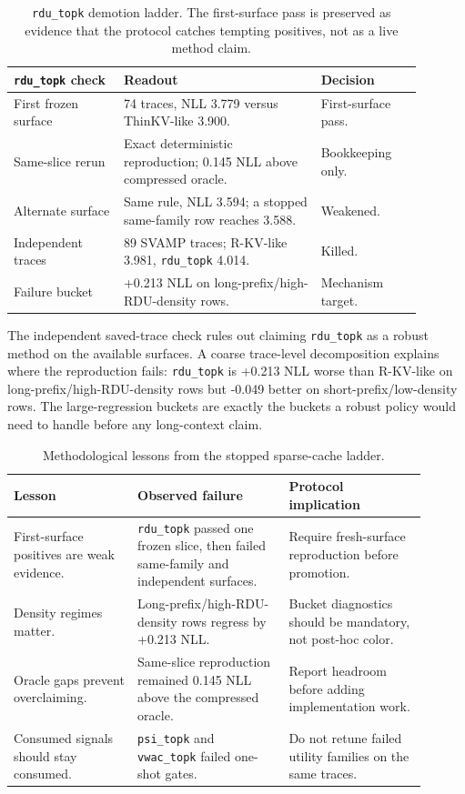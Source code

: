 \documentclass{article}
\begin{document}
\begin{table}[h]
\centering
\small
\begin{tabular}{p{0.24\linewidth}p{0.43\linewidth}p{0.22\linewidth}}
\toprule
\texttt{rdu\_topk} check & Readout & Decision \\
\midrule
First frozen surface & 74 traces, NLL 3.779 versus ThinKV-like 3.900. & First-surface pass. \\
Same-slice rerun & Exact deterministic reproduction; 0.145 NLL above compressed oracle. & Bookkeeping only. \\
Alternate surface & Same rule, NLL 3.594; a stopped same-family row reaches 3.588. & Weakened. \\
Independent traces & 89 SVAMP traces; R-KV-like 3.981, \texttt{rdu\_topk} 4.014. & Killed. \\
Failure bucket & +0.213 NLL on long-prefix/high-RDU-density rows. & Mechanism target. \\
\bottomrule
\end{tabular}
\caption{\texttt{rdu\_topk} demotion ladder. The first-surface pass is preserved as evidence that the protocol catches tempting positives, not as a live method claim.}
\end{table}

The independent saved-trace check rules out claiming \texttt{rdu\_topk} as a
robust method on the available surfaces. A coarse trace-level
decomposition explains where the reproduction fails: \texttt{rdu\_topk} is
+0.213 NLL worse than R-KV-like on long-prefix/high-RDU-density rows but -0.049
better on short-prefix/low-density rows. The large-regression buckets are
exactly the buckets a robust policy would need to handle before any long-context
claim.

\begin{table}[h]
\centering
\small
\begin{tabular}{p{0.27\linewidth}p{0.33\linewidth}p{0.30\linewidth}}
\toprule
Lesson & Observed failure & Protocol implication \\
\midrule
First-surface positives are weak evidence. & \texttt{rdu\_topk} passed one frozen slice, then failed same-family and independent surfaces. & Require fresh-surface reproduction before promotion. \\
Density regimes matter. & Long-prefix/high-RDU-density rows regress by +0.213 NLL. & Bucket diagnostics should be mandatory, not post-hoc color. \\
Oracle gaps prevent overclaiming. & Same-slice reproduction remained 0.145 NLL above the compressed oracle. & Report headroom before adding implementation work. \\
Consumed signals should stay consumed. & \texttt{psi\_topk} and \texttt{vwac\_topk} failed one-shot gates. & Do not retune failed utility families on the same traces. \\
\bottomrule
\end{tabular}
\caption{Methodological lessons from the stopped sparse-cache ladder.}
\end{table}
\end{document}
